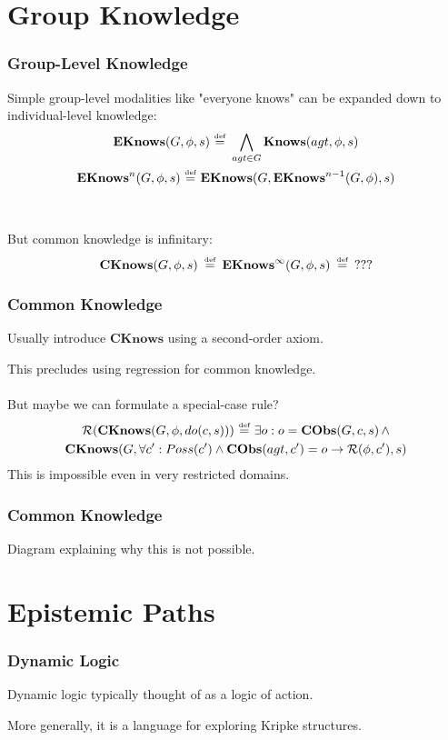 \documentclass[compress]{beamer}
\newcommand{\isdef}{\hbox{$\stackrel{\mbox{\tiny def}}{=}$}}
\newcommand{\Reg}{\mathcal{R}}
\newcommand{\EKnows}{\mathbf{EKnows}}
\newcommand{\Knows}{\mathbf{Knows}}
\newcommand{\CKnows}{\mathbf{CKnows}}
\begin{document}
\section{Group Knowledge}

\begin{frame}
\frametitle{Group-Level Knowledge}
Simple group-level modalities like "everyone knows" can be expanded down to individual-level knowledge:
\begin{gather*}
\EKnows(G,\phi,s)\,\,\isdef\,\,\bigwedge_{agt \in G} \Knows(agt,\phi,s)\\
\EKnows^{n}(G,\phi,s)\,\,\isdef\,\,\EKnows(G,\EKnows^{n-1}(G,\phi),s)
\end{gather*}
\ \\
\ \\
\pause
But common knowledge is infinitary:
\begin{equation*}
\CKnows(G,\phi,s)\,\,\,\isdef\,\,\,\EKnows^{\infty}(G,\phi,s)\,\,\,\isdef\,\,\,???
\end{equation*}
\end{frame}

\begin{frame}
\frametitle{Common Knowledge}
Usually introduce $\CKnows$ using a second-order axiom.

This precludes using regression for common knowledge.
\ \\
\ \\
\pause
But maybe we can formulate a special-case rule?
\begin{multline*}
\Reg(\CKnows(G,\phi,do(c,s)))\,\,\isdef\,\,\exists o: o = \mathbf{CObs}(G,c,s)\,\wedge \\
  \CKnows(G,\forall c': Poss(c')\wedge \mathbf{CObs}(agt,c')=o \rightarrow \Reg(\phi,c'),s)
\end{multline*}
\pause
This is \alert{impossible} even in very restricted domains.
\end{frame}

\begin{frame}
\frametitle{Common Knowledge}
Diagram explaining why this is not possible.
\end{frame}

\section{Epistemic Paths}

\begin{frame}
\frametitle{Dynamic Logic}
Dynamic logic typically thought of as a logic of action.

More generally, it is a language for exploring Kripke structures.
\end{frame}
\end{document}
